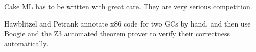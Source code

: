 Cake ML\cite{cakemlgc} has to be written with great care. They are very serious competition.

Hawblitzel and Petrank \cite{gcexample2} annotate x86 code
for two GCs by hand, and then use Boogie and the Z3 automated theorem prover
to verify their correctness automatically.



